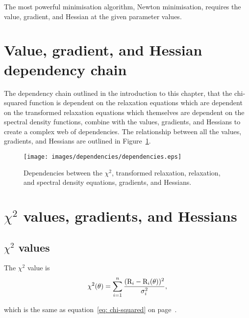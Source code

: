 The most powerful minimisation algorithm, Newton minimisation, requires the value, gradient, and Hessian at the given parameter values.




\section{Value, gradient, and Hessian dependency chain}

The dependency chain outlined in the introduction to this chapter, that the chi-squared function is dependent on the relaxation equations which are dependent on the transformed relaxation equations which themselves are dependent on the spectral density functions, combine with the values, gradients, and Hessians to create a complex web of dependencies.  The relationship between all the values, gradients, and Hessians are outlined in Figure~\ref{fig: dependencies}.

\begin{figure}[!h]
\centerline{\texttt{[image: images/dependencies/dependencies.eps]}}
\caption{Dependencies between the $\chi^2$, transformed relaxation, relaxation, and spectral density equations, gradients, and Hessians.}\label{fig: dependencies}
\end{figure}




\section{$\chi^2$ values, gradients, and Hessians}

\subsection{$\chi^2$ values}

The $\chi^2$ value is
\begin{equation}
 \chi^2(\theta) = \sum_{i=1}^n \frac{(\mathrm{R}_i - \mathrm{R}_i(\theta))^2}{\sigma_i^2},
\end{equation}

\noindent which is the same as equation~\eqref{eq: chi-squared} on page~\pageref{eq: chi-squared}.


